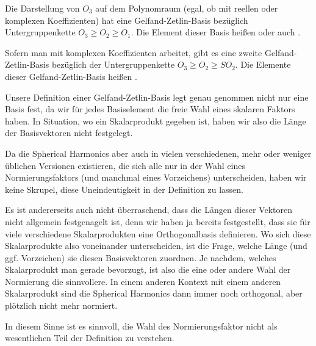 \pagebreak
\begin{maintheorem}\label{mt:sh_sind_gzb}
	Die Darstellung von $O_3$ auf dem Polynomraum (egal, ob mit reellen oder komplexen Koeffizienten) hat eine Gelfand-Zetlin-Basis bezüglich Untergruppenkette $O_3 \geq O_2 \geq O_1$. Die Element dieser Basis heißen  oder auch .

	Sofern man mit komplexen Koeffizienten arbeitet, gibt es eine zweite Gelfand-Zetlin-Basis bezüglich der Untergruppenkette $O_3 \geq O_2 \geq SO_2$. Die Elemente dieser Gelfand-Zetlin-Basis heißen .
\end{maintheorem}

\begin{remark}
Unsere Definition einer Gelfand-Zetlin-Basis legt genau genommen nicht nur eine Basis fest, da wir für jedes Basiselement die freie Wahl eines skalaren Faktors haben. In Situation, wo ein Skalarprodukt gegeben ist, haben wir also die Länge der Basisvektoren nicht festgelegt.

Da die Spherical Harmonics aber auch in vielen verschiedenen, mehr oder weniger üblichen Versionen existieren, die sich alle nur in der Wahl eines Normierungsfaktors (und manchmal eines Vorzeichens) unterscheiden, haben wir keine Skrupel, diese Uneindeutigkeit in der Definition zu lassen.

\medbreak
Es ist andererseits auch nicht überraschend, dass die Längen dieser Vektoren nicht allgemein festgenagelt ist, denn wir haben ja bereits festgestellt, dass sie für viele verschiedene Skalarprodukten eine Orthogonalbasis definieren. Wo sich diese Skalarprodukte also voneinander unterscheiden, ist die Frage, welche Länge (und ggf. Vorzeichen) sie diesen Basisvektoren zuordnen. Je nachdem, welches Skalarprodukt man gerade bevorzugt, ist also die eine oder andere Wahl der Normierung die sinnvollere. In einem anderen Kontext mit einem anderen Skalarprodukt sind die Spherical Harmonics dann immer noch orthogonal, aber plötzlich nicht mehr normiert.

In diesem Sinne ist es sinnvoll, die Wahl des Normierungsfaktor nicht als wesentlichen Teil der Definition zu verstehen.
\end{remark}


